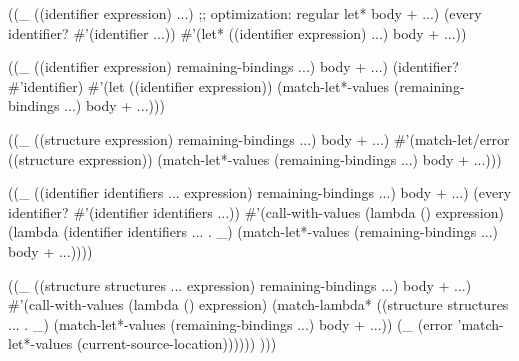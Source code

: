 \begin{Snippet}
      ((_ ((identifier expression) ...) ;; optimization: regular let*
	  body + ...)
       (every identifier? #'(identifier ...))
       #'(let* ((identifier expression) ...)
	   body + ...))
\end{Snippet}
\begin{Snippet}
      ((_ ((identifier expression) remaining-bindings ...)
	  body + ...)
       (identifier? #'identifier)
       #'(let ((identifier expression))
	   (match-let*-values (remaining-bindings ...) body + ...)))
\end{Snippet}
\begin{Snippet}
      ((_ ((structure expression) remaining-bindings ...)
	  body + ...)
       #'(match-let/error ((structure expression))
			  (match-let*-values (remaining-bindings ...) 
					     body + ...)))
\end{Snippet}
\begin{Snippet}
      ((_ ((identifier identifiers ... expression) remaining-bindings ...)
	  body + ...)
       (every identifier? #'(identifier identifiers ...))
       #'(call-with-values (lambda () expression) 
	   (lambda (identifier identifiers ... . _)
	     (match-let*-values (remaining-bindings ...) 
				body + ...))))
\end{Snippet}
\begin{Snippet}
      ((_ ((structure structures ... expression) remaining-bindings ...)
	  body + ...)
       #'(call-with-values (lambda () expression) 
	   (match-lambda* ((structure structures ... . _)
			   (match-let*-values (remaining-bindings ...) 
					      body + ...))
	     (_ (error 'match-let*-values (current-source-location))))))
      )))
\end{Snippet}
